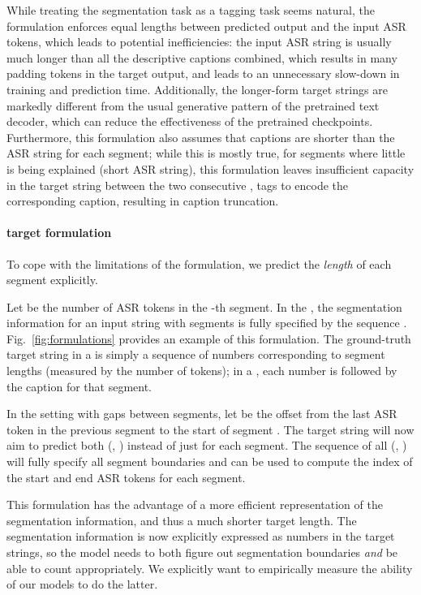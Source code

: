 \documentclass[11pt]{article}
\begin{document}
While treating the segmentation task as a tagging task seems natural,
the \hardencoding formulation enforces equal lengths between predicted output and the input ASR tokens, which leads to potential inefficiencies: 
the input ASR string is usually much longer than all the descriptive captions combined, which results in many padding tokens in the target output, and leads to an unnecessary slow-down in training and prediction time.   
Additionally, the longer-form target strings are markedly different from the usual generative pattern of the pretrained text decoder, which can reduce the effectiveness of the pretrained checkpoints.
Furthermore, this formulation also assumes that captions are shorter than the ASR string for each segment; while this is mostly true, for segments where little is being explained (short ASR string), this formulation leaves insufficient capacity in the target string between the two consecutive \sep{} tags to encode the corresponding caption, resulting in caption truncation.

\paragraph{\Offsetbased target formulation}
To cope with the limitations of the \hardencoding formulation, we predict the {\em length} of each segment explicitly.

Let  be the number of ASR tokens in the -th segment.
In the \partitionsetting, the segmentation information for an input string with  segments is fully specified by the sequence . 
Fig.~\ref{fig:formulations} provides an example of this \offsetbased formulation.
The ground-truth target string in a \segonly is simply a sequence of numbers corresponding to segment lengths (measured by the number of tokens); in a \segcap, each number is followed by the caption for that segment.

In the \vanilla setting with gaps between segments,
let  be the offset from the last ASR token in the previous segment to the start of segment .  
The target string will now aim to predict both (, ) instead of just  for each segment.
The sequence of all (, ) will fully specify all segment boundaries and can be used to compute the index of the start and end ASR tokens for each segment.  

This formulation has the advantage of a more efficient representation of the segmentation information, and thus a much shorter target length.
The segmentation information is now explicitly expressed as numbers in the target strings, so the model needs to both figure out segmentation boundaries {\em and} be able to count appropriately.
We explicitly want to empirically measure the ability of our models to do the latter.
\end{document}
